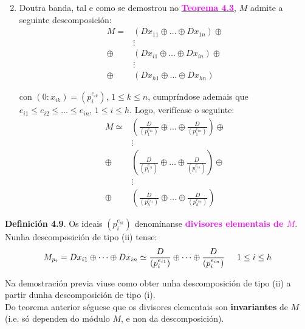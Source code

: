 \documentclass[twoside]{report}
\newcommand{\magbf}[1]{\textcolor{magenta}{\textbf{#1}}} %
\theoremstyle{mystyle}
\begin{document}
\begin{enumerate}
    \setcounter{enumi}{1}
    \item Doutra banda, tal e como se demostrou no \hyperref[th4.3]{\magbf{Teorema 4.3}}, $M$ admite a seguinte descomposición:
    \begin{align*}
        M = & (Dx_{11} \oplus \dots \oplus Dx_{1n}) \oplus \\
        & \vdots \\
        \oplus & (Dx_{i1} \oplus \dots \oplus Dx_{in}) \oplus \\
        & \vdots \\
        \oplus & (Dx_{h1} \oplus \dots \oplus Dx_{hn}) 
    \end{align*}
    
    con $(0 : x_{ik}) = (p_{i}^{e_{ik}})$, $1 \leq k \leq n$, cumpríndose ademais que $e_{i1} \leq e_{i2} \leq \dots \leq e_{in}$, $1 \leq i \leq h$. Logo, verifícase o seguinte:
    \begin{align*}
        M \simeq & \displaystyle \left (\frac{D}{(p_{1}^{e_{11}})} \oplus \dots \oplus \frac{D}{(p_{1}^{e_{1n}})} \right ) \oplus \\
        & \vdots \\
        \oplus & \left ( \frac{D}{(p_{i}^{e_{i1}})} \oplus \dots \oplus \frac{D}{(p_{i}^{e_{in}})} \right ) \oplus \\
        & \vdots \\
        \oplus & \left (\frac{D}{(p_{h}^{e_{h1}})} \oplus \dots \oplus \frac{D}{(p_{h}^{e_{hn}})} \right )
    \end{align*}
\end{enumerate}

\noindent \textbf{Definición 4.9}. Os ideais $(p_{i}^{e_{ik}})$ denomínanse \magbf{divisores elementais de $M$}.\\

\noindent Nunha descomposición de tipo (ii) tense:
$$M_{p_{i}} = Dx_{i1} \oplus \dots \oplus Dx_{in} \simeq \displaystyle \frac{D}{(p_{i}^{e_{i1}})} \oplus \dots \oplus \frac{D}{(p_{i}^{e_{in}})} \hspace{5mm} 1 \leq i \leq h$$

\noindent Na demostración previa viuse como obter unha descomposición de tipo (ii) a partir dunha descomposición de tipo (i). \\

\noindent Do teorema anterior séguese que os divisores elementais son \textbf{invariantes} de $M$ (i.e. só dependen do módulo $M$, e non da descomposición).\\
\end{document}
